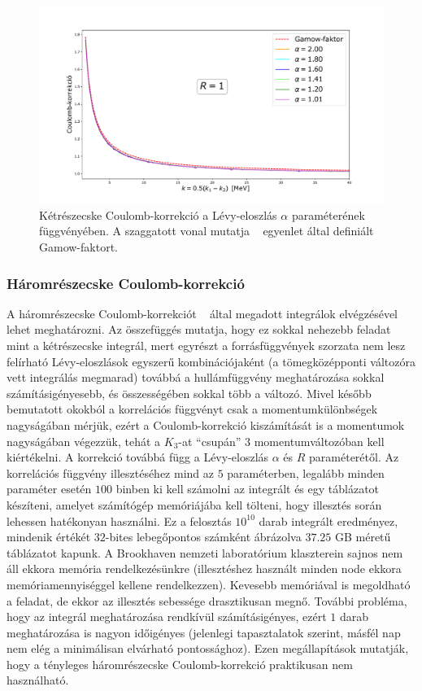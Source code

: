 \documentclass[11pt,a4paper]{article}
\numberwithin{equation}{subsection}
\numberwithin{figure}{section}
\begin{document}
\begin{figure}[H]
\centering
\includegraphics[scale=0.45]{pic/Coulomb/C2_dalpha_R1_S2correct.pdf}
\caption{Kétrészecske Coulomb-korrekció a Lévy-eloszlás $\alpha$ paraméterének függvényében. A szaggatott vonal mutatja ~ egyenlet által definiált Gamow-faktort.}
\label{fig:CRK2dalpha}
\end{figure}

\subsubsection{Háromrészecske Coulomb-korrekció}

A háromrészecske Coulomb-korrekciót ~ által megadott integrálok elvégzésével lehet meghatározni. Az összefüggés mutatja, hogy ez sokkal nehezebb feladat mint a kétrészecske integrál, mert egyrészt a forrásfüggvények szorzata nem lesz felírható Lévy-eloszlások egyszerű kombinációjaként (a tömegközépponti változóra vett integrálás megmarad) továbbá a hullámfüggvény meghatározása sokkal számításigényesebb, és összességében sokkal több a változó. Mivel később bemutatott okokból a korrelációs függvényt csak a momentumkülönbségek nagyságában mérjük, ezért a Coulomb-korrekció kiszámítását is a momentumok nagyságában végezzük, tehát a $K_3$-at ``csupán'' $3$ momentumváltozóban kell kiértékelni. A korrekció továbbá függ a Lévy-eloszlás $\alpha$ és $R$ paraméterétől. Az korrelációs függvény illesztéséhez mind az $5$ paraméterben, legalább minden paraméter esetén $100$ binben ki kell számolni az integrált és egy táblázatot készíteni, amelyet számítógép memóriájába kell tölteni, hogy illesztés során lehessen hatékonyan használni. Ez a felosztás $10^{10}$ darab integrált eredményez, mindenik értékét $32$-bites lebegőpontos számként ábrázolva $37.25$ GB méretű táblázatot kapunk. A Brookhaven nemzeti laboratórium klaszterein sajnos nem áll ekkora memória rendelkezésünkre (illesztéshez használt minden node ekkora memóriamennyiséggel kellene rendelkezzen). Kevesebb memóriával is megoldható a feladat, de ekkor az illesztés sebessége drasztikusan megnő. További probléma, hogy az integrál meghatározása rendkívül számításigényes, ezért $1$ darab meghatározása is nagyon időigényes (jelenlegi tapasztalatok szerint, másfél nap nem elég a minimálisan elvárható pontossághoz). Ezen megállapítások mutatják, hogy a tényleges háromrészecske Coulomb-korrekció praktikusan nem használható.
\end{document}
